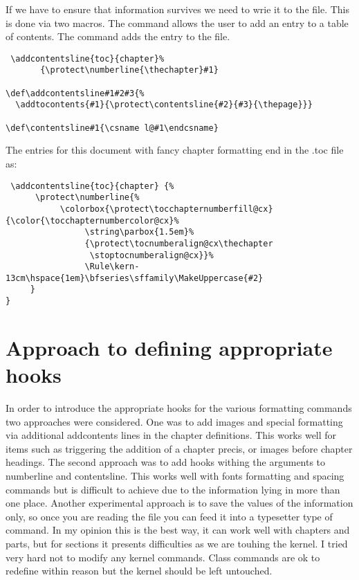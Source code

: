 If we have to ensure that information survives we need to wrie it to the file. This is done via two macros.
The  command allows the user to add an entry to a table of contents. The command adds the entry
 to the  file.

\begin{lstlisting}
 \addcontentsline{toc}{chapter}%
       {\protect\numberline{\thechapter}#1}

\def\addcontentsline#1#2#3{%
  \addtocontents{#1}{\protect\contentsline{#2}{#3}{\thepage}}}

\def\contentsline#1{\csname l@#1\endcsname}
\end{lstlisting}

The entries for this document with fancy chapter formatting end in the .toc file as:
\begin{lstlisting}
 \addcontentsline{toc}{chapter} {%
      \protect\numberline{%
           \colorbox{\protect\tocchapternumberfill@cx}{\color{\tocchapternumbercolor@cx}%
                \string\parbox{1.5em}%
                {\protect\tocnumberalign@cx\thechapter
                 \stoptocnumberalign@cx}}%
                \Rule\kern-13cm\hspace{1em}\bfseries\sffamily\MakeUppercase{#2}
     }
}
\end{lstlisting}


\section{Approach to defining appropriate hooks}

In order to introduce the appropriate hooks for the various formatting commands two approaches were considered. One was to add images and special formatting via additional addcontents lines in the chapter definitions. This works well for items such as triggering the addition of a chapter precis, or images before chapter headings. The second approach was to add hooks withing the arguments to numberline and contentsline. This works well with fonts formatting and spacing commands but is difficult to achieve due to the information lying in more than one place. Another experimental approach is to save the values of the information only, so once you are reading the file you can feed it into a typesetter type of command. In my opinion this is the best way, it can work well with chapters and parts, but for sections it presents difficulties as we are touhing the kernel. I tried very hard not to modify any kernel commands. Class commands are ok to redefine within reason but the kernel should be left untouched.

